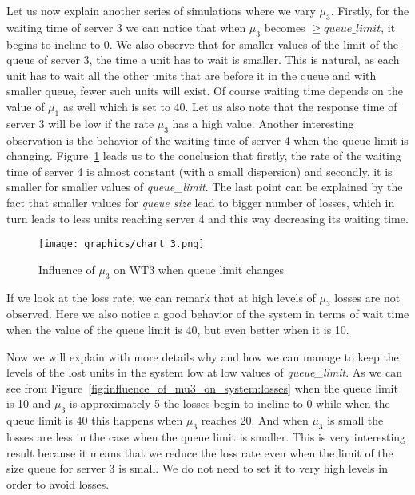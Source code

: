 \documentclass[12pt]{article}
\theoremstyle{plain}
\begin{document}
Let us now explain another series of simulations where we vary $\mu_3$.
Firstly, for the waiting time of server 3 we can notice that when $\mu_3$
becomes $\ge queue\_limit$, it begins to incline to 0. We also observe that for
smaller values of the limit of the queue of server 3, the time a unit has to
wait is smaller. This is natural, as each unit has to wait all the other units
that are before it in the queue and with smaller queue, fewer such units will
exist. Of course waiting time depends on the value of $\mu_1$ as well which is
set to 40. Let us also note that the response time of server 3 will be low if
the rate $\mu_3$ has a high value. Another interesting observation is the
behavior of the waiting time of server 4 when the queue limit is changing. 
Figure~\ref{fig:influence_of_mu3_on_wt3_when_queue_limit_changes} leads us to
the conclusion that firstly, the rate of the waiting time of server 4 is almost
constant (with a small dispersion) and secondly, it is smaller for smaller
values of \emph{queue\_limit}. The last point can be explained by the fact that
smaller values for \emph{queue size} lead to bigger number of losses, which in
turn leads to less units reaching server 4 and this way decreasing its waiting
time.  

\begin{figure}
  \caption{Influence of $\mu_3$ on WT3 when queue limit changes}
  \texttt{[image: graphics/chart\_3.png]}
  \label{fig:influence_of_mu3_on_wt3_when_queue_limit_changes}
\end{figure}

If we look at the loss rate, we can remark that at high levels of $\mu_3$ losses
are not observed. Here we also notice a good behavior of the system in terms of
wait time when the value of the queue limit is 40, but even better when it is
10.  

Now we will explain with more details why and how we can manage to keep the
levels of the lost units in the system low at low values of \emph{queue\_limit}.
As we can see from Figure~\ref{fig:influence_of_mu3_on_system:losses} when the
queue limit is 10 and $\mu_3$ is approximately 5 the losses begin to incline to 0
while when the queue limit is 40 this happens when $\mu_3$ reaches 20. And when
$\mu_3$ is small the losses are less in the case when the queue limit is
smaller. This is very interesting result because it means that we reduce
the loss rate even when the limit of the size queue for server 3 is small. We
do not need to set it to very high levels in order to avoid losses.  
\end{document}
